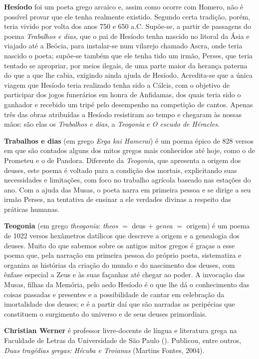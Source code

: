 \textbf{Hesíodo} foi um poeta grego arcaico e, assim como ocorre com Homero,
não é possível provar que ele tenha realmente existido. Segundo certa tradição,
porém, teria vivido por volta dos anos 750 e 650 a.C.  Supõe-se, a partir de
passagens do poema \textit{Trabalhos e dias}, que o pai de Hesíodo tenha
nascido no litoral da Ásia e viajado até a Beócia, para instalar-se num
vilarejo chamado Ascra, onde teria nascido o poeta; supõe-se também que ele
tenha tido um irmão, Perses, que teria tentado se apropriar, por meios ilegais,
de uma parte maior da herança paterna do que a que lhe cabia, exigindo ainda
ajuda de Hesíodo. Acredita-se que a única viagem que Hesíodo teria realizado
tenha sido a Cálcis, com o objetivo de participar dos jogos funerários em honra
de Anfidamas, dos quais teria sido o ganhador e recebido um tripé pelo
desempenho na competição de cantos. Apenas três das obras atribuídas a Hesíodo
resistiram ao tempo e chegaram às nossas mãos: são elas os \textit{Trabalhos e
dias}, a \textit{Teogonia} e \textit{O escudo de Héracles}.

\textbf{Trabalhos e dias} (em grego \textit{Erga kai Hamerai}) é um poema épico
de 828 versos em que são contados alguns dos mitos gregos mais conhecidos até
hoje, como o de Prometeu e o de Pandora. Diferente da \textit{Teogonia}, que
apresenta a origem dos deuses, este poema é voltado para a condição dos
mortais, explicitando suas necessidades e limitações, com foco no trabalho
agrícola baseado nas estações do ano. Com a ajuda das Musas, o poeta narra em
primeira pessoa e se dirige a seu irmão Perses, na tentativa de ensinar a ele
verdades divinas a respeito das práticas humanas.

\textbf{Teogonia} (em grego \textit{theogonia}: \textit{theos} $=$ deus +
\textit{genea} $=$ origem) é um poema de 1022 versos hexâmetros datílicos que
descreve a origem e a genealogia dos deuses. Muito do que sabemos sobre os
antigos mitos gregos é graças a esse poema que, pela narração em primeira
pessoa do próprio poeta, sistematiza e organiza as histórias da criação do
mundo e do nascimento dos deuses, com ênfase especial a Zeus e às suas façanhas
até chegar ao poder. A invocação das Musas, filhas da Memória, pelo aedo
Hesíodo é o que lhe dá o conhecimento das coisas passadas e presentes e a
possibilidade de cantar em celebração da imortalidade dos deuses; e é a partir
daí que são narradas as peripécias que constituem o surgimento do universo e de
seus deuses primordiais.  

\textbf{Christian Werner} é professor livre-docente de língua e literatura
grega na Faculdade de Letras da Universidade de São Paulo ().
Publicou, entre outros, \textit{Duas tragédias gregas: Hécuba e Troianas}
(Martins Fontes, 2004).







